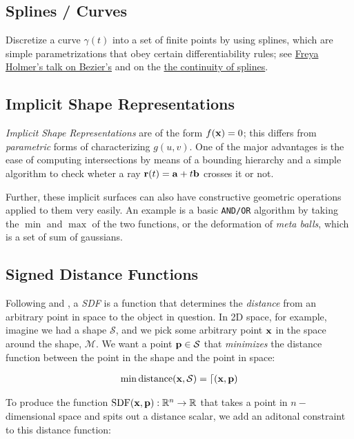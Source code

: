 \subsection{Splines / Curves}

Discretize a curve $\gamma(t)$ into a set of finite points
by using splines, which are simple parametrizations that obey
certain differentiability rules; see 
\href{https://www.youtube.com/watch?v=aVwxzDHniEw}{Freya Holmer's talk
on Bezier's} and on the 
\href{https://www.youtube.com/watch?v=jvPPXbo87ds}{the continuity of
splines}.

\subsection{Implicit Shape Representations}

\emph{Implicit Shape Representations} are of the form 
$f(\bf{x})=0$; this differs from \emph{parametric} forms
of characterizing $g(u,v)$. One of the major advantages is the
ease of computing intersections \cite{ray1} by means of a
bounding hierarchy and a simple algorithm to check
wheter a ray $\bf{r}(t)=\bf{a}+t\bf{b}$ crosses
it or not.

\spa

Further, these implicit surfaces can also have constructive
geometric operations applied to them very easily. An example is
a basic \texttt{AND/OR} algorithm by taking the $\min$ and
$\max$ of the two functions, or the deformation of
\emph{meta balls}, which is a set of sum of gaussians.

\subsection{Signed Distance Functions} \label{SDFs}

Following \cite{wave1} and \cite{SDF1}, a \emph{SDF} is a function that
determines the \emph{distance} from an arbitrary point in space to the
object in question. In 2D space, for example, imagine we had
a shape $\mathcal{S}$, and we pick some arbitrary point 
$\bf{x}$ in the space around the shape, $\mathcal{M}$. We want
a point $\bf{p} \in \mathcal{S}$ that \emph{minimizes} the distance
function between the point in the shape and the point in space:

\begin{align*}
    \min \text{distance}(\bf{x}, \cal{S}) = d(\bf{x,p})
\end{align*}

To produce the function 
$\text{SDF}(\bf{x,p}) : \RR^n\rightarrow\RR$ that
takes a point in $n-$dimensional space and spits out a distance scalar,
we add an aditonal constraint to this distance function:

